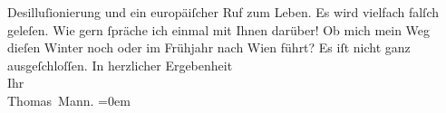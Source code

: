 \begin{ledgroupsized}[t]{13cm}
               Desilluſionierung und ein europäiſcher Ruf zum
               Leben. Es wird vielfach falſch geleſen.\pend
           \pstart
           Wie gern ſpräche ich einmal mit Ihnen darüber! Ob mich mein Weg dieſen Winter noch
               oder im Frühjahr nach Wien führt? Es iſt nicht
               ganz ausgeſchloſſen.\pend
           \pstart
           In herzlicher Ergebenheit{\\[\baselineskip]}Ihr{\\[\baselineskip]}\spacefill\mbox{Thomas Mann.}\pend
           \leftskip=0em{}
         
         \endnumbering{}\end{ledgroupsized}  \newcommand{\dateiname}{L02430}\newcommand{\titel}{Thomas Mann an Arthur Schnitzler, 9. 1. 1925}\newcommand{\editorInnen}{Martin Anton Müller und Gerd-Hermann Susen}
      